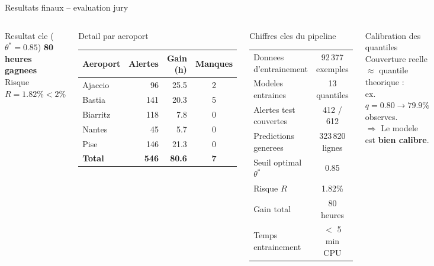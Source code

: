 \documentclass[aspectratio=169, 10pt]{beamer}
\begin{document}
\begin{frame}{Resultats finaux -- evaluation jury}
  \begin{columns}[T]
      \begin{alertblock}{Resultat cle ($\theta^* = 0.85$)}
        \centering\large
        \textbf{80 heures gagnees}\\[4pt]
        \normalsize Risque $R = 1.82\% < 2\%$ \checkmark
      \end{alertblock}
      \vspace{0.2cm}
      \begin{block}{Detail par aeroport}
        \footnotesize
        \centering
        \begin{tabular}{lrrc}
          \toprule
          Aeroport & Alertes & Gain (h) & Manques \\
          \midrule
          Ajaccio  &  96 & 25.5 & 2 \\
          Bastia   & 141 & 20.3 & 5 \\
          Biarritz & 118 &  7.8 & 0 \\
          Nantes   &  45 &  5.7 & 0 \\
          Pise     & 146 & 21.3 & 0 \\
          \midrule
          \textbf{Total} & \textbf{546} & \textbf{80.6} & \textbf{7} \\
          \bottomrule
        \end{tabular}
      \end{block}

      \begin{block}{Chiffres cles du pipeline}
        \footnotesize
        \begin{tabular}{lc}
          \toprule
          Donnees d'entrainement & 92\,377 exemples \\
          Modeles entraines & 13 quantiles \\
          Alertes test couvertes & 412 / 612 \\
          Predictions generees & 323\,820 lignes \\
          \midrule
          Seuil optimal $\theta^*$ & 0.85 \\
          Risque $R$ & 1.82\% \\
          Gain total & 80 heures \\
          Temps entrainement & $<$ 5 min CPU \\
          \bottomrule
        \end{tabular}
      \end{block}
      \vspace{0.2cm}
      \begin{exampleblock}{Calibration des quantiles}
        Couverture reelle $\approx$ quantile theorique :\\
        ex. $q = 0.80 \to 79.9\%$ observes.\\
        $\Rightarrow$ Le modele est \textbf{bien calibre}.
      \end{exampleblock}
  \end{columns}
\end{frame}
\end{document}

